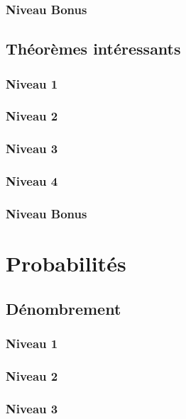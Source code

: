 \documentclass[a4paper]{report}
\begin{document}
			\subsection{Niveau Bonus}
		
		\section{Théorèmes intéressants}
		
			\subsection{Niveau 1}
		
			\subsection{Niveau 2}
		
			\subsection{Niveau 3}
			
			\subsection{Niveau 4}
			
			\subsection{Niveau Bonus}
	
	\chapter{Probabilités}
	
		\section{Dénombrement}
		
			\subsection{Niveau 1}
		
			\subsection{Niveau 2}
		
			\subsection{Niveau 3}
			
\end{document}
